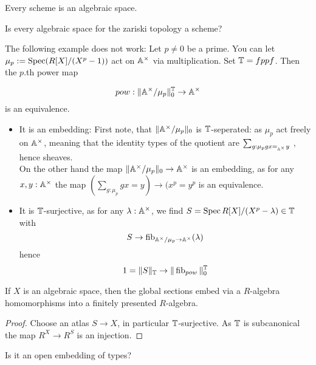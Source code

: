 \begin{corollary}		
		Every scheme is an algebraic space.
\end{corollary}
\begin{question}
	Is every algebraic space for the zariski topology a scheme?
\end{question}
\begin{rmk}
	The following example does not work: Let $p \neq 0$ be a prime. You can let $\mu_p := \operatorname{Spec}(R[X] / (X^p - 1))$ act on $\mathbb{A}^\times$ via multiplication. Set $\mathbb{T}= fppf$. Then the $p$.th power map

	\[
	pow : \| \mathbb{A}^\times / \mu_p \|_0^{\mathbb{T}} \to \mathbb{A}^\times
	\]
	is an equivalence.
	\begin{itemize}
		\item 	 It is an embedding: 
		First note, that $\|\mathbb{A}^\times / \mu_p \|_0$ is $\mathbb{T}$-seperated:
		as $\mu_p$ act freely on $\mathbb{A}^\times$, meaning that the identity types of the quotient are $\sum_{g: \mu_p g x =_{\mathbb{A}^\times} y}$ , hence sheaves. \\
		On the other hand the map $\|\mathbb{A}^\times / \mu_p \|_0 \to \mathbb{A}^\times$ is an embedding, as for any $x , y : \mathbb{A}^\times$ the map $(\sum_{g : \mu_p} g x = y) \to (x^p = y^p$ is an equivalence. 
		\item 	It is $\mathbb{T}$-surjective, as for any $\lambda : \mathbb{A}^\times$, we find $S = \operatorname{Spec} R [X] / (X^p - \lambda) \in \mathbb{T}$ with 
		\[
		S \to \operatorname{fib}_{\mathbb{A}^\times / \mu_p \to \mathbb{A}^\times}(\lambda)
		\]
		hence 
		\[
		1 = \|S\|_{\mathbb{T}} \to \|\operatorname{fib}_{pow}\|_0^{\mathbb{T}}
		\]
	\end{itemize}


\end{rmk}

\begin{lemma}
	If $X$ is an algebraic space, then the global sections embed via a $R$-algebra homomorphisms into a finitely presented $R$-algebra.
\end{lemma}
\begin{proof}
	Choose an atlas $S \to X$, in particular $\mathbb{T}$-surjective. As $\mathbb{T}$ is subcanonical the map $R^X \to R^S$ is an injection.
\end{proof}
\begin{question}
	Is it an open embedding of types?
\end{question}
